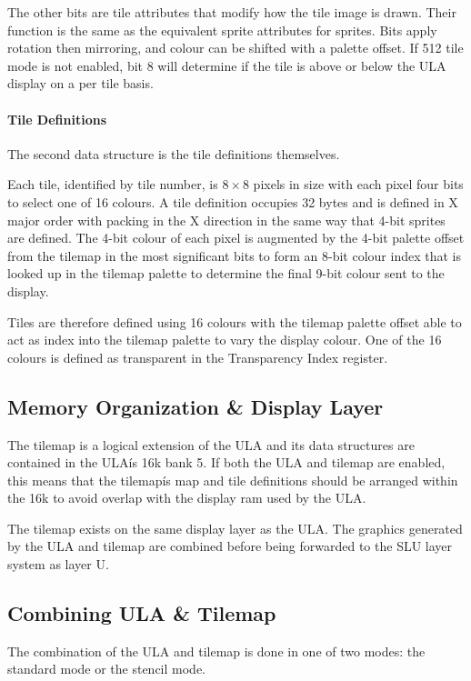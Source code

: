 The other bits are tile attributes that modify how the tile image is
drawn. Their function is the same as the equivalent sprite attributes
for sprites. Bits apply rotation then mirroring, and colour can be
shifted with a palette offset. If 512 tile mode is not enabled, bit 8
will determine if the tile is above or below the ULA display on a per
tile basis.

\paragraph{Tile Definitions}
The second data structure is the tile definitions themselves.

Each tile, identified by tile number, is $8\times8$ pixels in size
with each pixel four bits to select one of 16 colours. A tile
definition occupies 32 bytes and is defined in X major order with
packing in the X direction in the same way that 4-bit sprites are
defined. The 4-bit colour of each pixel is augmented by the 4-bit
palette offset from the tilemap in the most significant bits to form
an 8-bit colour index that is looked up in the tilemap palette to
determine the final 9-bit colour sent to the display.

Tiles are therefore defined using 16 colours with the tilemap palette
offset able to act as index into the tilemap palette to vary the
display colour. One of the 16 colours is defined as transparent in the
Transparency Index register.

\subsection{Memory Organization \& Display Layer}
The tilemap is a logical extension of the ULA and its data structures
are contained in the ULAís 16k bank 5. If both the ULA and tilemap are
enabled, this means that the tilemapís map and tile definitions should
be arranged within the 16k to avoid overlap with the display ram used
by the ULA.

The tilemap exists on the same display layer as the ULA. The graphics
generated by the ULA and tilemap are combined before being forwarded
to the SLU layer system as layer U.

\subsection{Combining ULA \& Tilemap}
The combination of the ULA and tilemap is done in one of two modes:
the standard mode or the stencil mode.

